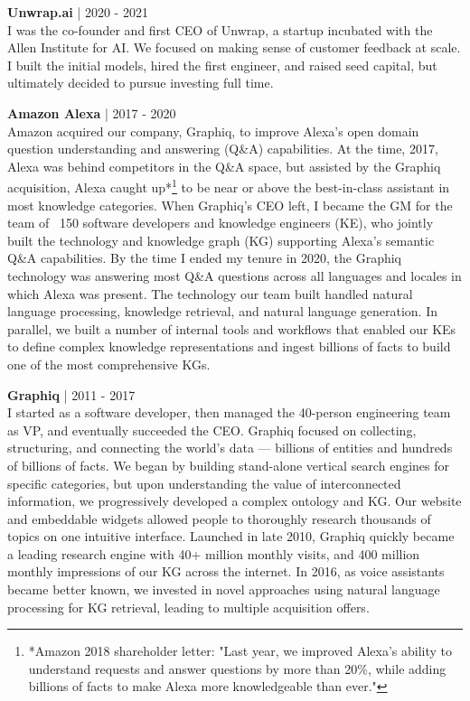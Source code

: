 \documentclass[a4paper,10pt]{article}
\begin{document}
\vspace{5pt} %

\noindent
\textbf{Unwrap.ai} | 2020 - 2021 \\
I was the co-founder and first CEO of Unwrap, a startup incubated with the Allen Institute for AI. We focused on making sense of customer feedback at scale. I built the initial models, hired the first engineer, and raised seed capital, but ultimately decided to pursue investing full time.

\vspace{5pt} %

\noindent
\textbf{Amazon Alexa} | 2017 - 2020 \\
Amazon acquired our company, Graphiq, to improve Alexa's open domain question understanding and answering (Q\&A) capabilities. At the time, 2017, Alexa was behind competitors in the Q\&A space, but assisted by the Graphiq acquisition, Alexa caught up*\footnote{*Amazon 2018 shareholder letter: "Last year, we improved Alexa’s ability to understand requests and answer questions by more than 20\%, while adding billions of facts to make Alexa more knowledgeable than ever."}  to be near or above the best-in-class assistant in most knowledge categories. When Graphiq's CEO left, I became the GM for the team of ~150 software developers and knowledge engineers (KE), who jointly built the technology and knowledge graph (KG) supporting Alexa's semantic Q\&A capabilities. By the time I ended my tenure in 2020, the Graphiq technology was answering most Q\&A questions across all languages and locales in which Alexa was present. The technology our team built handled natural language processing, knowledge retrieval, and natural language generation. In parallel, we built a number of internal tools and workflows that enabled our KEs to define complex knowledge representations and ingest billions of facts to build one of the most comprehensive KGs.

\vspace{5pt} %

\noindent
\textbf{Graphiq} | 2011 - 2017 \\
I started as a software developer, then managed the 40-person engineering team as VP, and eventually succeeded the CEO. Graphiq focused on collecting, structuring, and connecting the world’s data — billions of entities and hundreds of billions of facts. We began by building stand-alone vertical search engines for specific categories, but upon understanding the value of interconnected information, we progressively developed a complex ontology and KG. Our website and embeddable widgets allowed people to thoroughly research thousands of topics on one intuitive interface. Launched in late 2010, Graphiq quickly became a leading research engine with 40+ million monthly visits, and 400 million monthly impressions of our KG across the internet. In 2016, as voice assistants became better known, we invested in novel approaches using natural language processing for KG retrieval, leading to multiple acquisition offers.
\end{document}
